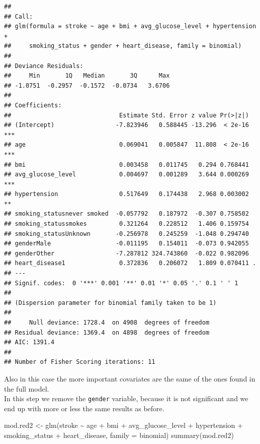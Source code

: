 \documentclass[
]{article}
\newenvironment{Shaded}{\begin{snugshade}}{\end{snugshade}}
\newcommand{\AttributeTok}[1]{\textcolor[rgb]{0.77,0.63,0.00}{#1}}
\newcommand{\FunctionTok}[1]{\textcolor[rgb]{0.00,0.00,0.00}{#1}}
\newcommand{\NormalTok}[1]{#1}
\newcommand{\OtherTok}[1]{\textcolor[rgb]{0.56,0.35,0.01}{#1}}
\newcommand{\SpecialCharTok}[1]{\textcolor[rgb]{0.00,0.00,0.00}{#1}}
\begin{document}
\begin{verbatim}
## 
## Call:
## glm(formula = stroke ~ age + bmi + avg_glucose_level + hypertension + 
##     smoking_status + gender + heart_disease, family = binomial)
## 
## Deviance Residuals: 
##     Min       1Q   Median       3Q      Max  
## -1.0751  -0.2957  -0.1572  -0.0734   3.6706  
## 
## Coefficients:
##                              Estimate Std. Error z value Pr(>|z|)    
## (Intercept)                 -7.823946   0.588445 -13.296  < 2e-16 ***
## age                          0.069041   0.005847  11.808  < 2e-16 ***
## bmi                          0.003458   0.011745   0.294 0.768441    
## avg_glucose_level            0.004697   0.001289   3.644 0.000269 ***
## hypertension                 0.517649   0.174438   2.968 0.003002 ** 
## smoking_statusnever smoked  -0.057792   0.187972  -0.307 0.758502    
## smoking_statussmokes         0.321264   0.228512   1.406 0.159754    
## smoking_statusUnknown       -0.256978   0.245259  -1.048 0.294740    
## genderMale                  -0.011195   0.154011  -0.073 0.942055    
## genderOther                 -7.287812 324.743860  -0.022 0.982096    
## heart_disease1               0.372836   0.206072   1.809 0.070411 .  
## ---
## Signif. codes:  0 '***' 0.001 '**' 0.01 '*' 0.05 '.' 0.1 ' ' 1
## 
## (Dispersion parameter for binomial family taken to be 1)
## 
##     Null deviance: 1728.4  on 4908  degrees of freedom
## Residual deviance: 1369.4  on 4898  degrees of freedom
## AIC: 1391.4
## 
## Number of Fisher Scoring iterations: 11
\end{verbatim}

Also in this case the more important covariates are the same of the ones
found in the full model.\\
In this step we remove the \texttt{gender} variable, because it is not
significant and we end up with more or less the same results as before.

\begin{Shaded}
\begin{Highlighting}[]
\NormalTok{mod.red2 }\OtherTok{\textless{}{-}} \FunctionTok{glm}\NormalTok{(stroke }\SpecialCharTok{\textasciitilde{}}\NormalTok{ age }\SpecialCharTok{+}\NormalTok{ bmi }\SpecialCharTok{+}\NormalTok{ avg\_glucose\_level }\SpecialCharTok{+}\NormalTok{ hypertension }\SpecialCharTok{+} 
\NormalTok{                  smoking\_status  }\SpecialCharTok{+}\NormalTok{ heart\_disease, }\AttributeTok{family =}\NormalTok{ binomial)}
\FunctionTok{summary}\NormalTok{(mod.red2)}
\end{Highlighting}
\end{Shaded}
\end{document}
